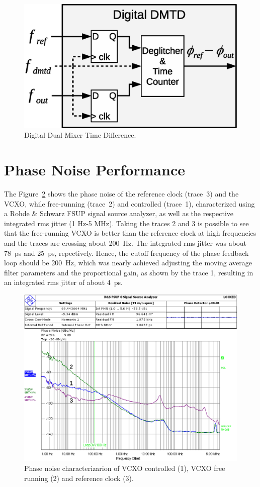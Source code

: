 \documentclass[a4paper,
               biblatex,      %
               ]{jacow}
\begin{document}
\begin{figure}[!htb]
   \centering
   \includegraphics*[width=0.8\columnwidth]{DigitalDMTD}
   \caption{Digital Dual Mixer Time Difference.}
   \label{fig:DigitalDMTD}
\end{figure}

\section{Phase Noise Performance}

The Figure~\ref{fig:AFCPhaseNoise} shows the phase noise of the reference clock (trace~3) and the VCXO, while free-running (trace~2) and controlled (trace~1), characterized using a Rohde \& Schwarz FSUP signal source analyzer, as well as the respective integrated rms jitter (1 Hz-5 MHz). Taking the traces 2 and 3 is possible to see that the free-running VCXO is better than the reference clock at high frequencies and the traces are crossing about 200~Hz. The integrated rms jitter was about 78~ps and 25~ps, repectively. Hence, the cutoff frequency of the phase feedback loop should be 200~Hz, which was nearly achieved adjusting the moving average filter parameters and the proportional gain, as shown by the trace 1, resulting in an integrated rms jitter of about 4~ps.

\begin{figure}[!htb]
   \centering
   \includegraphics*[width=0.9\columnwidth]{Phase_noise}
   \caption{Phase noise characterizarion of VCXO controlled (1), VCXO free running (2) and reference clock (3).}
   \label{fig:AFCPhaseNoise}
\end{figure}
\end{document}
